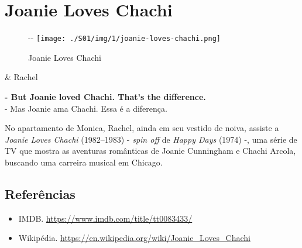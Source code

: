 \hypertarget{joanie-loves-chachi}{%
\section{Joanie Loves Chachi}\label{joanie-loves-chachi}}

\begin{figure}[!ht]
  \begin{adjustwidth}{-\oddsidemargin-1in}{-\rightmargin}
    \centering
    \texttt{[image: ./S01/img/1/joanie-loves-chachi.png]}
    \caption{Joanie Loves Chachi\label{fig:joanie-loves-chachi}}
  \end{adjustwidth}
\end{figure}

\begin{tcolorbox}[enhanced,center upper,
    drop fuzzy shadow southeast, boxrule=0.3pt,
    lower separated=false,
    colframe=black!30!dialogoBorder,colback=white]
\begin{minipage}[c]{0.14\linewidth}
   & \centering \scriptsize{Rachel}
\end{minipage}
\hspace{.1mm}
\begin{minipage}[c]{0.8\linewidth}
  \textbf{- But Joanie loved Chachi. That's the difference.}\\
  - Mas Joanie ama Chachi. Essa é a diferença.
\end{minipage}
\end{tcolorbox}

No apartamento de Monica, Rachel, ainda em seu vestido de noiva, assiste
a \emph{Joanie Loves Chachi} (1982--1983) - \emph{spin off} de
\emph{Happy Days} (1974) -, uma série de TV que mostra as aventuras
românticas de Joanie Cunningham e Chachi Arcola, buscando uma carreira
musical em Chicago.

\hypertarget{referuxeancias-5}{%
\subsection{Referências}\label{referuxeancias-5}}

\begin{itemize}
\tightlist
\item
  \sloppy IMDB. \url{https://www.imdb.com/title/tt0083433/}
\item
  \sloppy Wikipédia. \url{https://en.wikipedia.org/wiki/Joanie_Loves_Chachi}
\end{itemize}

